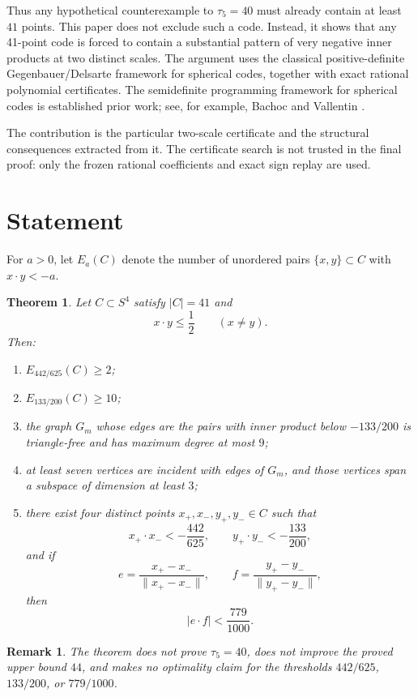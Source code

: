 \documentclass[11pt]{article}
\newtheorem{theorem}{Theorem}
\newtheorem{remark}{Remark}
\begin{document}
Thus any hypothetical counterexample to $\tau_5=40$ must already contain at
least $41$ points. This paper does not exclude such a code. Instead, it
shows that any 41-point code is forced to contain a substantial pattern of
very negative inner products at two distinct scales. The argument uses the
classical positive-definite Gegenbauer/Delsarte framework for spherical codes,
together with exact rational polynomial certificates. The semidefinite
programming framework for spherical codes is established prior work; see,
for example, Bachoc and Vallentin \cite{bachocvallentin2008}.

The contribution is the particular two-scale certificate and the structural
consequences extracted from it. The certificate search is not trusted in the
final proof: only the frozen rational coefficients and exact sign replay are
used.

\section{Statement}

For $a>0$, let $E_a(C)$ denote the number of unordered pairs
$\{x,y\}\subset C$ with $x\cdot y<-a$.

\begin{theorem}\label{thm:main}
Let $C\subset S^4$ satisfy $|C|=41$ and
\[
x\cdot y\le \frac12 \qquad (x\ne y).
\]
Then:
\begin{enumerate}
\item $E_{442/625}(C)\ge2$;
\item $E_{133/200}(C)\ge10$;
\item the graph $G_m$ whose edges are the pairs with inner product below
      $-133/200$ is triangle-free and has maximum degree at most $9$;
\item at least seven vertices are incident with edges of $G_m$, and those
      vertices span a subspace of dimension at least $3$;
\item there exist four distinct points $x_+,x_-,y_+,y_-\in C$ such that
\[
x_+\cdot x_-<-\frac{442}{625},\qquad
y_+\cdot y_-<-\frac{133}{200},
\]
and if
\[
e=\frac{x_+-x_-}{\|x_+-x_-\|},\qquad
f=\frac{y_+-y_-}{\|y_+-y_-\|},
\]
then
\[
|e\cdot f|<\frac{779}{1000}.
\]
\end{enumerate}
\end{theorem}

\begin{remark}
The theorem does not prove $\tau_5=40$, does not improve the proved upper
bound $44$, and makes no optimality claim for the thresholds $442/625$,
$133/200$, or $779/1000$.
\end{remark}
\end{document}
